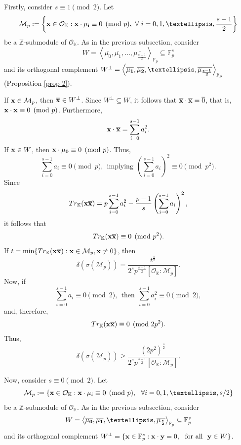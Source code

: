 \documentclass[10pt,a4paper]{amsart}
\begin{document}
Firstly, consider $s \equiv 1\pmod 2$. Let
\begin{equation}\label{M_p_s_1}
    \mathcal{M}_p:=\left\{{\bf x}\in\mathcal{O}_{\mathbb{K}}:{\bf x}\cdot {\bf \mu_i}\equiv 0\pmod p, \ \forall~i=0,1,\ldots,\frac{s-1}{2}\right\}
\end{equation}
be a $\mathbb{Z}$-submodule of $\mathcal{O}_{\mathbb{K}}$. As in the previous subsection, consider $$W = \left\langle\overline{\mu_0},\overline{\mu_1},\ldots,\overline{\mu_{\frac{s-1}{2}}}\right\rangle_{\mathbb{F}_p} \subseteq\mathbb{F}_p^s$$ and its orthogonal complement $W^{\perp} = \left\langle\overline{\bf \mu_1},\overline{\bf \mu_2},\ldots,\overline{\bf \mu_{\frac{s-1}{2}}}\right\rangle_{\mathbb{F}_p}$ (Proposition \ref{prop-2}).

If ${\bf x}\in\mathcal{M}_p$, then $\overline{\bf x}\in W^{\perp}$. Since $W^{\perp}\subseteq W$, it follows that $\overline{\bf x}\cdot\overline{\bf x}=\overline{0}$, that is, ${\bf x}\cdot {\bf x}\equiv 0\pmod p$. Furthermore, \[ {\bf x}\cdot \overline{\bf x} = \sum_{i=0}^{s-1}a_i^2 . \] If ${\bf x}\in W$, then ${\bf x}\cdot {\bf \mu_0}\equiv 0\pmod p$. Thus, \[ \sum_{i=0}^{s-1}a_i\equiv 0\pmod p, \ \ \mbox{implying} \ \ \left(\sum_{i=0}^{s-1}a_i\right)^2\equiv 0\pmod p^2. \] 
Since \[ Tr_{\mathbb{K}}({\bf x}\overline{\bf x}) = p\sum_{i=0}^{s-1}a_i^2 -\frac{p-1}{s}\left(\sum_{i=0}^{s-1}a_i\right)^2 ,\] it follows that \[ Tr_{\mathbb{K}}({\bf x}\overline{\bf x}) \equiv 0 \pmod {p^2}. \] If $t=\min\{Tr_{\mathbb{K}}({\bf x}\overline{\bf x}): {\bf x}\in\mathcal{M}_p, {\bf x}\neq 0\}$, then \[ \delta(\sigma(\mathcal{M}_p)) = \frac{t^{\frac{s}{2}}}{2^sp^\frac{s-1}{2}[\mathcal{O}_{\mathbb{K}}:\mathcal{M}_p]}. \] Now, if 
\[ \sum_{i=0}^{s-1}a_i\equiv 0\pmod 2, \ \ \mbox{then} \ \ \sum_{i=0}^{s-1}a_i^2\equiv 0 \pmod 2, \] and, therefore, \[ Tr_{\mathbb{K}}({\bf x}\overline{\bf x}) \equiv 0\pmod {2p^2}. \] Thus, \begin{equation} \label{eq-2} \delta(\sigma(\mathcal{M}_p)) \geq \frac{(2p^2)^{\frac{s}{2}}}{2^sp^{\frac{s-1}{2}}[\mathcal{O}_{\mathbb{K}}:\mathcal{M}_p]}. \end{equation}

Now, consider $s \equiv 0\pmod 2$. Let
\begin{equation} \label{M_p_s_0}
   \mathcal{M}_p := \{{\bf x}\in\mathcal{O}_{\mathbb{K}}:{\bf x}\cdot {\bf \mu}_i\equiv 0 \pmod{p}, \ \ \forall i=0,1,\ldots,s/2\} 
\end{equation}
\[  \] be a $\mathbb{Z}$-submodule of $\mathcal{O}_{\mathbb{K}}$.
As in the previous subsection, consider
\[  W=\left\langle\overline{\bf \mu_0},\overline{\bf \mu_1},\ldots,\overline{\bf \mu_{\frac{s}{2}}}\right\rangle_{\mathbb{F}_p} \subseteq\mathbb{F}_p^s \]
and its orthogonal complement $W^{\perp} = \{ {\bf x} \in \mathbb{F}_p^s:{\bf x}\cdot{\bf y}=0, \ \ \mbox{for all} \ \ {\bf y}\in W\}$.
\end{document}
